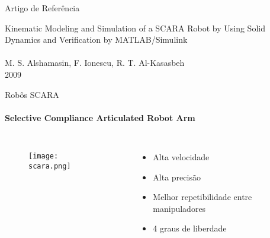 \begin{frame}[t]{Artigo de Referência} 
    \begin{center}
        \huge 
        Kinematic Modeling and Simulation of a SCARA Robot by Using Solid Dynamics and Verification by
        MATLAB/Simulink\\
        \!
        \\
        \normalsize
        M. S. Alshamasin, F. Ionescu, R. T. Al-Kasasbeh\\
        2009
        
    \end{center}
\end{frame}
\begin{frame}[c]{Robôs SCARA}
    \framesubtitle{Selective Compliance Articulated Robot Arm} 
    \begin{columns}

        \begin{figure}
            \texttt{[image: scara.png]}
        \end{figure}

        \Large
        \begin{itemize}
            \item Alta velocidade
            \item Alta precisão
            \item Melhor repetibilidade entre manipuladores
            \item 4 graus de liberdade
        \end{itemize}

    \end{columns}
   
\end{frame}
